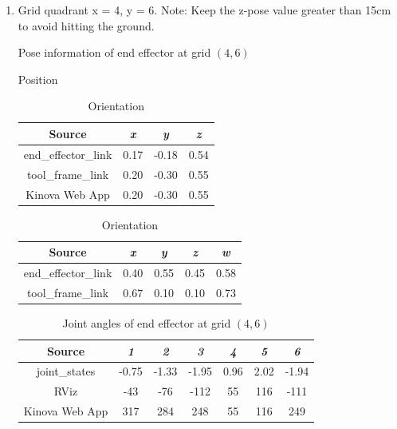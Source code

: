 \documentclass[12pt]{article}
\begin{document}
\begin{enumerate}
\begin{enumerate}
        \item Grid quadrant x = 4, y = 6. Note: Keep the z-pose value greater than 15cm to avoid hitting the ground.

        \begin{table}[H]
            \caption{Pose information of end effector at grid $(4, 6)$}
            \begin{subtable}{.4\linewidth}
                \centering
                \caption{Position}
                \begin{tabular}{cccc}
                    \toprule
                    Source & \textit{x} & \textit{y} & \textit{z} \\\midrule
                    end\_effector\_link & 0.17 & -0.18 & 0.54 \\
                    tool\_frame\_link & 0.20 & -0.30 & 0.55 \\
                    Kinova Web App & 0.20 & -0.30 & 0.55 \\\bottomrule
                \end{tabular}
            \end{subtable}
            \hfill
            \begin{subtable}{.52\linewidth}
                \centering
                \caption{Orientation}
                \begin{tabular}{ccccc}
                    \toprule
                    Source & \textit{x} & \textit{y} & \textit{z} & \textit{w} \\\midrule
                    end\_effector\_link & 0.40 & 0.55 & 0.45 & 0.58 \\
                    tool\_frame\_link & 0.67 & 0.10 & 0.10 & 0.73 \\\bottomrule
                \end{tabular}
            \end{subtable}
        \end{table}
        \vspace{-10pt}
        \begin{table}[H]
            \centering
            \caption{Joint angles of end effector at grid $(4, 6)$}
            \begin{tabular}{ccccccc}
            \toprule
            Source & \textit{1} & \textit{2} & \textit{3} & \textit{4} & \textit{5} & \textit{6} \\\midrule
            joint\_states & -0.75 & -1.33 & -1.95 & 0.96 & 2.02 & -1.94 \\
            RViz & -43 & -76 & -112 & 55 & 116 & -111 \\
            Kinova Web App & 317 & 284 & 248 & 55 & 116 & 249 \\\bottomrule
            \end{tabular}
        \end{table}
    

\end{enumerate}
\end{enumerate}
\end{document}
